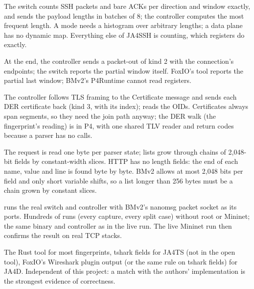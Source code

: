 {The switch counts SSH packets and bare ACKs per direction and window exactly, and sends the payload lengths in
batches of 8; the controller computes the most frequent length.}
{A mode needs a histogram over arbitrary lengths; a data plane has no dynamic map. Everything else of JA4SSH is
counting, which registers do exactly.}

{At the end, the controller sends a packet-out of kind 2 with the connection's endpoints; the switch reports the
partial window itself.}
{FoxIO's tool reports the partial last window; BMv2's P4Runtime cannot read registers.}

{The controller follows TLS framing to the Certificate message and sends each DER certificate back (kind 3, with its
index);  reads the OIDs.}
{Certificates always span segments, so they need the join path anyway; the DER walk (the fingerprint's reading) is
in P4, with one shared TLV reader and return codes because a parser has no calls.}

{The request is read one byte per parser state; lists grow through chains of 2,048-bit fields by constant-width
slices.}
{HTTP has no length fields: the end of each name, value and line is found byte by byte. BMv2 allows at most 2,048
bits per field and only short variable shifts, so a list longer than 256 bytes must be a chain grown by constant
slices.}

{ runs the real switch and controller with BMv2's nanomsg packet socket as its ports.}
{Hundreds of runs (every capture, every split case) without root or Mininet; the same binary and controller as in
the live run. The live Mininet run then confirms the result on real TCP stacks.}

{The Rust  tool for most fingerprints, tshark fields for JA4TS (not in the open tool), FoxIO's Wireshark
plugin output (or the same rule on tshark fields) for JA4D.}
{Independent of this project: a match with the authors' implementation is the strongest evidence of correctness.}

